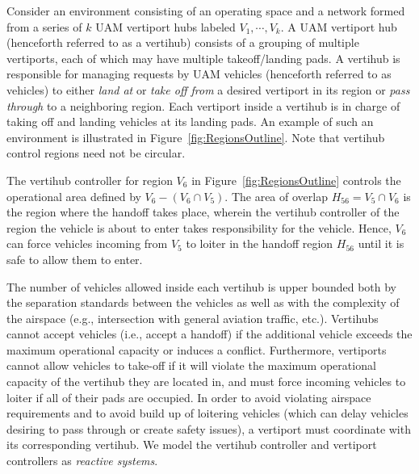  Consider an environment consisting of an operating space and a network formed from a series of $k$ UAM vertiport hubs labeled $V_1,\cdots,V_k$. A UAM vertiport hub (henceforth referred to as a vertihub) consists of a grouping of multiple vertiports, each of which may have multiple takeoff/landing pads. A vertihub is responsible for managing requests by UAM vehicles (henceforth referred to as vehicles) to either \emph{land at} or \emph{take off from} a desired vertiport in its region or \emph{pass through} to a neighboring region. Each vertiport inside a vertihub is in charge of taking off and landing vehicles at its landing pads. An example of such an environment is illustrated in Figure~\ref{fig:RegionsOutline}. Note that vertihub control regions need not be circular. 
\begin{eg}
The vertihub controller for region $V_6$ in Figure~\ref{fig:RegionsOutline} controls the operational area defined by $V_6 - (V_6 \cap V_5)$. The area of overlap $H_{56} = V_5 \cap V_6$ is the region where the handoff takes place, wherein the vertihub controller of the region the vehicle is about to enter takes responsibility for the vehicle.
Hence, $V_6$ can force vehicles incoming from $V_5$ to loiter in the handoff region $H_{56}$ until it is safe to allow them to enter.
\end{eg}

The number of vehicles allowed inside each vertihub is upper bounded both by the separation standards between the vehicles as well as with the complexity of the airspace (e.g., intersection with general aviation traffic, etc.).
Vertihubs cannot accept vehicles (i.e., accept a handoff) if the additional vehicle exceeds the maximum operational capacity or induces a conflict. Furthermore, vertiports cannot allow vehicles to take-off if it will violate the maximum operational capacity of the vertihub they are located in, and must force incoming vehicles to loiter if all of their pads are occupied. In order to avoid violating airspace requirements and to avoid build up of loitering vehicles (which can delay vehicles desiring to pass through or create safety issues), a vertiport must coordinate with its corresponding vertihub. We model the vertihub controller and vertiport controllers as \emph{reactive systems}.

